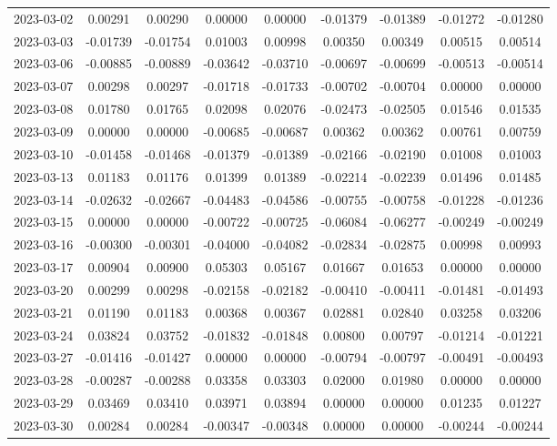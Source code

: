 \begin{footnotesize}
\begin{longtable}{lcccccccc}
2023-03-02 & 0.00291 & 0.00290 & 0.00000 & 0.00000 & -0.01379 & -0.01389 & -0.01272 & -0.01280 \\
2023-03-03 & -0.01739 & -0.01754 & 0.01003 & 0.00998 & 0.00350 & 0.00349 & 0.00515 & 0.00514 \\
2023-03-06 & -0.00885 & -0.00889 & -0.03642 & -0.03710 & -0.00697 & -0.00699 & -0.00513 & -0.00514 \\
2023-03-07 & 0.00298 & 0.00297 & -0.01718 & -0.01733 & -0.00702 & -0.00704 & 0.00000 & 0.00000 \\
2023-03-08 & 0.01780 & 0.01765 & 0.02098 & 0.02076 & -0.02473 & -0.02505 & 0.01546 & 0.01535 \\
2023-03-09 & 0.00000 & 0.00000 & -0.00685 & -0.00687 & 0.00362 & 0.00362 & 0.00761 & 0.00759 \\
2023-03-10 & -0.01458 & -0.01468 & -0.01379 & -0.01389 & -0.02166 & -0.02190 & 0.01008 & 0.01003 \\
2023-03-13 & 0.01183 & 0.01176 & 0.01399 & 0.01389 & -0.02214 & -0.02239 & 0.01496 & 0.01485 \\
2023-03-14 & -0.02632 & -0.02667 & -0.04483 & -0.04586 & -0.00755 & -0.00758 & -0.01228 & -0.01236 \\
2023-03-15 & 0.00000 & 0.00000 & -0.00722 & -0.00725 & -0.06084 & -0.06277 & -0.00249 & -0.00249 \\
2023-03-16 & -0.00300 & -0.00301 & -0.04000 & -0.04082 & -0.02834 & -0.02875 & 0.00998 & 0.00993 \\
2023-03-17 & 0.00904 & 0.00900 & 0.05303 & 0.05167 & 0.01667 & 0.01653 & 0.00000 & 0.00000 \\
2023-03-20 & 0.00299 & 0.00298 & -0.02158 & -0.02182 & -0.00410 & -0.00411 & -0.01481 & -0.01493 \\
2023-03-21 & 0.01190 & 0.01183 & 0.00368 & 0.00367 & 0.02881 & 0.02840 & 0.03258 & 0.03206 \\
2023-03-24 & 0.03824 & 0.03752 & -0.01832 & -0.01848 & 0.00800 & 0.00797 & -0.01214 & -0.01221 \\
2023-03-27 & -0.01416 & -0.01427 & 0.00000 & 0.00000 & -0.00794 & -0.00797 & -0.00491 & -0.00493 \\
2023-03-28 & -0.00287 & -0.00288 & 0.03358 & 0.03303 & 0.02000 & 0.01980 & 0.00000 & 0.00000 \\
2023-03-29 & 0.03469 & 0.03410 & 0.03971 & 0.03894 & 0.00000 & 0.00000 & 0.01235 & 0.01227 \\
2023-03-30 & 0.00284 & 0.00284 & -0.00347 & -0.00348 & 0.00000 & 0.00000 & -0.00244 & -0.00244 \\

\end{longtable}
\end{footnotesize}
